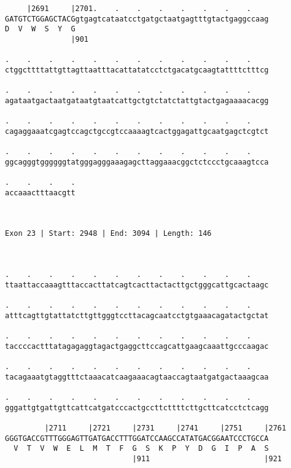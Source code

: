 \documentclass{article}
\begin{document}
\begin{Verbatim}
     |2691     |2701.    .    .    .    .    .    .    .    
GATGTCTGGAGCTACGgtgagtcataatcctgatgctaatgagtttgtactgaggccaag
D  V  W  S  Y  G                                            
               |901                                         
  
.    .    .    .    .    .    .    .    .    .    .    .    
ctggcttttattgttagttaatttacattatatcctctgacatgcaagtattttctttcg
                                                            
.    .    .    .    .    .    .    .    .    .    .    .    
agataatgactaatgataatgtaatcattgctgtctatctattgtactgagaaaacacgg
                                                            
.    .    .    .    .    .    .    .    .    .    .    .    
cagaggaaatcgagtccagctgccgtccaaaagtcactggagattgcaatgagctcgtct
                                                            
.    .    .    .    .    .    .    .    .    .    .    .    
ggcagggtggggggtatgggagggaaagagcttaggaaacggctctccctgcaaagtcca
                                                            
.    .    .    .
accaaactttaacgtt
                
                
 
Exon 23 | Start: 2948 | End: 3094 | Length: 146



.    .    .    .    .    .    .    .    .    .    .    .    
ttaattaccaaagtttaccacttatcagtcacttactacttgctgggcattgcactaagc
                                                            
.    .    .    .    .    .    .    .    .    .    .    .    
atttcagttgtattatcttgttgggtccttacagcaatcctgtgaaacagatactgctat
                                                            
.    .    .    .    .    .    .    .    .    .    .    .    
taccccactttatagagaggtagactgaggcttccagcattgaagcaaattgcccaagac
                                                            
.    .    .    .    .    .    .    .    .    .    .    .    
tacagaaatgtaggtttctaaacatcaagaaacagtaaccagtaatgatgactaaagcaa
                                                            
.    .    .    .    .    .    .    .    .    .    .    .    
gggattgtgattgttcattcatgatcccactgccttcttttcttgcttcatcctctcagg
                                                            
         |2711     |2721     |2731     |2741     |2751     |2761
GGGTGACCGTTTGGGAGTTGATGACCTTTGGATCCAAGCCATATGACGGAATCCCTGCCA
  V  T  V  W  E  L  M  T  F  G  S  K  P  Y  D  G  I  P  A  S
                             |911                          |921
  

\end{Verbatim}
\end{document}
